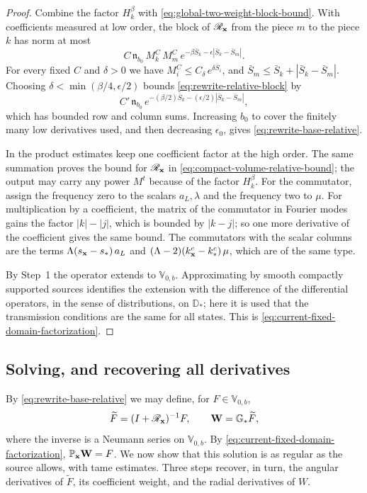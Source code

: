 \begin{proof}
Combine the factor $H_k^\beta$ with
\eqref{eq:global-two-weight-block-bound}. With coefficients measured
at low order, the block of $\mathscr R_{\mathbf x}$ from the piece $m$ to
the piece $k$ has norm at most
\begin{equation}\label{eq:rewrite-relative-block}
 C\,\mathfrak n_{b_0}\,M_k^C\,M_m^C\,
            e^{-\beta\bar S_k-\epsilon|\bar S_k-\bar S_m|} .
\end{equation}
For every fixed $C$ and $\delta>0$ we have
$M_i^C\le C_\delta\,e^{\delta\bar S_i}$, and
$\bar S_m\le\bar S_k+|\bar S_k-\bar S_m|$. Choosing
$\delta<\min(\beta/4,\epsilon/2)$ bounds
\eqref{eq:rewrite-relative-block} by
\[
 C'\,\mathfrak n_{b_0}\,
       e^{-(\beta/2)\bar S_k-(\epsilon/2)|\bar S_k-\bar S_m|} ,
\]
which has bounded row and column sums. Increasing $b_0$ to cover the
finitely many low derivatives used, and then decreasing $\epsilon_0$,
gives \eqref{eq:rewrite-base-relative}.

In the product estimates keep one coefficient factor at the high
order. The same summation proves the bound for $\mathscr R_{\mathbf x}$ in
\eqref{eq:compact-volume-relative-bound}; the output may carry any
power $M^t$ because of the factor $H_k^\beta$. For the commutator,
assign the frequency zero to the scalars $a_L,\lambda$ and the
frequency two to $\mu$. For multiplication by a coefficient, the
matrix of the commutator in Fourier modes gains the factor
$|k|-|j|$, which is bounded by $|k-j|$; so one more derivative of the
coefficient gives the same bound. The commutators with the scalar
columns are the terms $\Lambda(s_{\mathbf x}-s_*)\,a_L$ and
$(\Lambda-2)(k_{\mathbf x}^c-k_*^c)\,\mu$, which are of the same type.

By Step~1 the operator extends to $\mathbb V_{0,b}$. Approximating by
smooth compactly supported sources identifies the extension with the
difference of the differential operators, in the sense of
distributions, on $\mathbb D_*$; here it is used that the
transmission conditions are the same for all states. This is
\eqref{eq:current-fixed-domain-factorization}.
\end{proof}

\subsection{Solving, and recovering all derivatives}
\label{subsec:higher}

By \eqref{eq:rewrite-base-relative} we may define, for
$F\in\mathbb V_{0,b}$,
\[
 \widetilde F=(I+\mathscr R_{\mathbf x})^{-1}F,
 \qquad \mathbf W=\mathbb G_*\widetilde F ,
\]
where the inverse is a Neumann series on $\mathbb V_{0,b}$. By
\eqref{eq:current-fixed-domain-factorization},
$\mathbb P_{\mathbf x}\mathbf W=F$. We now show that this solution is as regular
as the source allows, with tame estimates. Three steps recover, in
turn, the angular derivatives of $\widetilde F$, its coefficient
weight, and the radial derivatives of $W$.

